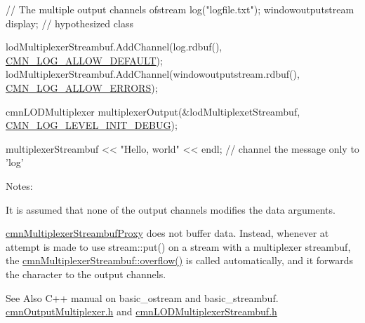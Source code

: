 \begin{DoxyCode}
\textcolor{comment}{// The multiple output channels}
ofstream log(\textcolor{stringliteral}{"logfile.txt"});
windowoutputstream display;    \textcolor{comment}{// hypothesized class}

lodMultiplexerStreambuf.AddChannel(log.rdbuf(), \hyperlink{cmn_log_lo_d_8h_a941e5ff3075571f0ad1e53e1204bd856}{CMN\_LOG\_ALLOW\_DEFAULT});
lodMultiplexerStreambuf.AddChannel(windowoutputstream.rdbuf(), 
      \hyperlink{cmn_log_lo_d_8h_ab7e55f4e2a66d48b58961a862ba40cc2}{CMN\_LOG\_ALLOW\_ERRORS});

cmnLODMultiplexer multiplexerOutput(&lodMultiplexetStreambuf, 
      \hyperlink{cmn_log_lo_d_8h_a27e55e3638c78366331ee3c1ca3d60ef}{CMN\_LOG\_LEVEL\_INIT\_DEBUG});

multiplexerStreambuf << \textcolor{stringliteral}{"Hello, world"} << endl;  \textcolor{comment}{// channel the message only to 'log'}
\end{DoxyCode}


Notes\-:
\begin{DoxyEnumerate}
\item It is assumed that none of the output channels modifies the data arguments.
\item \hyperlink{classcmn_multiplexer_streambuf_proxy}{cmn\-Multiplexer\-Streambuf\-Proxy} does not buffer data. Instead, whenever at attempt is made to use stream\-::put() on a stream with a multiplexer streambuf, the \hyperlink{classcmn_multiplexer_streambuf_a90999d31356176b52174452e2a43c1ae}{cmn\-Multiplexer\-Streambuf\-::overflow()} is called automatically, and it forwards the character to the output channels.
\end{DoxyEnumerate}

\begin{DoxySeeAlso}{See Also}
C++ manual on basic\-\_\-ostream and basic\-\_\-streambuf. \hyperlink{cmn_output_multiplexer_8h}{cmn\-Output\-Multiplexer.\-h} and \hyperlink{cmn_l_o_d_multiplexer_streambuf_8h}{cmn\-L\-O\-D\-Multiplexer\-Streambuf.\-h} 
\end{DoxySeeAlso}


